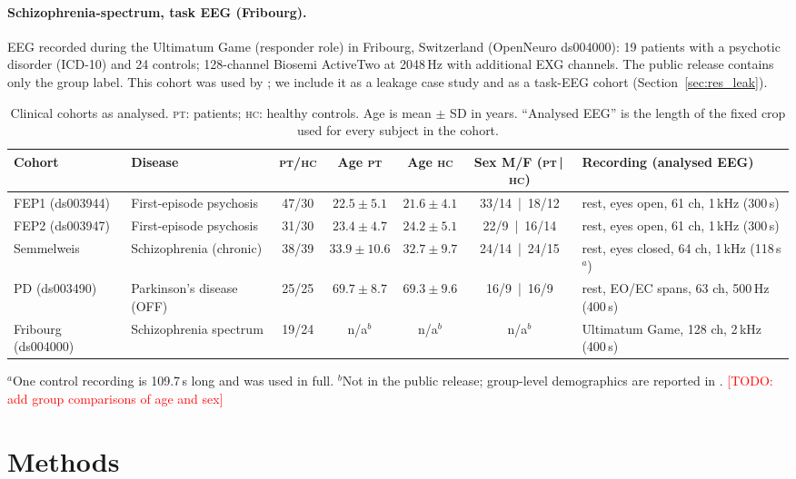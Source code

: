 \documentclass[11pt]{article}
\newcommand{\todo}[1]{\textcolor{red}{[TODO: #1]}}
\newcommand{\pt}{\textsc{pt}}
\newcommand{\hc}{\textsc{hc}}
\begin{document}
\paragraph{Schizophrenia-spectrum, task EEG (Fribourg).}
EEG recorded during the Ultimatum Game (responder role) in Fribourg, Switzerland \citep{padee_ds004000,horat2018} (OpenNeuro ds004000): 19 patients with a psychotic disorder (ICD-10) and 24 controls; 128-channel Biosemi ActiveTwo at 2048\,Hz with additional EXG channels.
The public release contains only the group label.
This cohort was used by \citet{calhas2023medrxiv}; we include it as a leakage case study and as a task-EEG cohort (Section~\ref{sec:res_leak}).

\begin{table}[t]
\centering
\caption{Clinical cohorts as analysed. \pt: patients; \hc: healthy controls. Age is mean $\pm$ SD in years. ``Analysed EEG'' is the length of the fixed crop used for every subject in the cohort.}
\label{tab:cohorts}
\small
\begin{tabular}{llccccl}
\toprule
Cohort & Disease & \pt/\hc & Age \pt & Age \hc & Sex M/F (\pt\,|\,\hc) & Recording (analysed EEG) \\
\midrule
FEP1 (ds003944) & First-episode psychosis & 47/30 & $22.5\pm5.1$ & $21.6\pm4.1$ & 33/14 \,|\, 18/12 & rest, eyes open, 61 ch, 1\,kHz (300\,s) \\
FEP2 (ds003947) & First-episode psychosis & 31/30 & $23.4\pm4.7$ & $24.2\pm5.1$ & 22/9 \,|\, 16/14 & rest, eyes open, 61 ch, 1\,kHz (300\,s) \\
Semmelweis & Schizophrenia (chronic) & 38/39 & $33.9\pm10.6$ & $32.7\pm9.7$ & 24/14 \,|\, 24/15 & rest, eyes closed, 64 ch, 1\,kHz (118\,s$^{a}$) \\
PD (ds003490) & Parkinson's disease (OFF) & 25/25 & $69.7\pm8.7$ & $69.3\pm9.6$ & 16/9 \,|\, 16/9 & rest, EO/EC spans, 63 ch, 500\,Hz (400\,s) \\
Fribourg (ds004000) & Schizophrenia spectrum & 19/24 & n/a$^{b}$ & n/a$^{b}$ & n/a$^{b}$ & Ultimatum Game, 128 ch, 2\,kHz (400\,s) \\
\bottomrule
\end{tabular}

\raggedright\footnotesize
$^{a}$One control recording is 109.7\,s long and was used in full. $^{b}$Not in the public release; group-level demographics are reported in \citet{horat2018}.
\todo{add group comparisons of age and sex}
\end{table}

\section{Methods}
\end{document}
